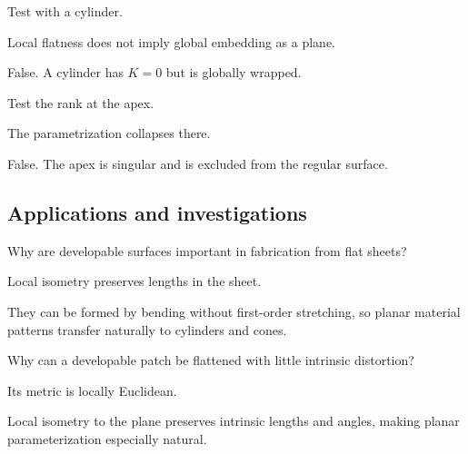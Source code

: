 \begin{exercise}[Every \(K=0\) surface is globally a plane]\label{exr:vii18-ped-11}
Test with a cylinder.
\end{exercise}
\begin{hint}
Local flatness does not imply global embedding as a plane.
\end{hint}
\begin{solution}
False.  A cylinder has \(K=0\) but is globally wrapped.
\end{solution}

\begin{exercise}\label{exr:vii18-ped-12}
Test the rank at the apex.
\end{exercise}
\begin{hint}
The parametrization collapses there.
\end{hint}
\begin{solution}
False.  The apex is singular and is excluded from the regular surface.
\end{solution}

\subsection*{Applications and investigations}

\begin{exercise}\label{exr:vii18-ped-13}
Why are developable surfaces important in fabrication from flat sheets?
\end{exercise}
\begin{hint}
Local isometry preserves lengths in the sheet.
\end{hint}
\begin{solution}
They can be formed by bending without first-order stretching, so planar material patterns transfer naturally to cylinders and cones.
\end{solution}

\begin{exercise}\label{exr:vii18-ped-14}
Why can a developable patch be flattened with little intrinsic distortion?
\end{exercise}
\begin{hint}
Its metric is locally Euclidean.
\end{hint}
\begin{solution}
Local isometry to the plane preserves intrinsic lengths and angles, making planar parameterization especially natural.
\end{solution}

